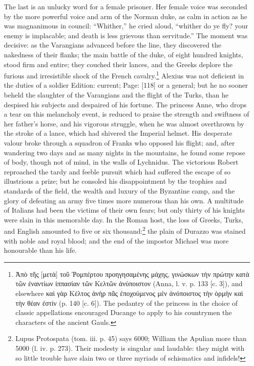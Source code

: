 {The last is an unlucky word for a female prisoner.} Her female voice was seconded by the more powerful voice and arm of the Norman duke, as calm in action as he was magnanimous in council: \texthebrew{“}Whither,\texthebrew{}” he cried aloud, \texthebrew{“}whither do ye fly? your enemy is implacable; and death is less grievous than servitude.\texthebrew{}” The moment was decisive: as the Varangians advanced before the line, they discovered the nakedness of their flanks; the main battle of the duke, of eight hundred knights, stood firm and entire; they couched their lances, and the Greeks deplore the furious and irresistible shock of the French cavalry.\footnote{\textgreek{\texthebrew{Ἀ}π\texthebrew{ὸ} τ\texthebrew{ῆ}ς} [\textgreek{μετ\texthebrew{ὰ}}] \textgreek{το\texthebrew{ῦ Ῥ}ομπέρτου προηγησαμένης μάχης, γινώσκων τ\texthebrew{ὴ}ν πρώτην κατ\texthebrew{ὰ} τ\texthebrew{ῶ}ν \texthebrew{ἐ}ναντίων \texthebrew{ἰ}ππασίαν τ\texthebrew{ῶ}ν Κελτ\texthebrew{ῶ}ν \texthebrew{ἀ}νύποιστον} (Anna, l. v. p. 133 [c. 3]), and elsewhere \textgreek{κα\texthebrew{ὶ} γ\texthebrew{ὰ}ρ Κέλτος \texthebrew{ἁ}ν\texthebrew{ὴ}ρ π\texthebrew{ᾶ}ς \texthebrew{ἐ}ποχούμενος μ\texthebrew{ὲ}ν \texthebrew{ἀ}νόποιστος τ\texthebrew{ὴ}ν \texthebrew{ὸ}ρμ\texthebrew{ὴ}ν κα\texthebrew{ὶ} τ\texthebrew{ὴ}ν θέαν \texthebrew{ἐ}στίν} (p. 140 [c. 6]). The pedantry of the princess in the choice of classic appellations encouraged Ducange to apply to his countrymen the characters of the ancient Gauls.} Alexius was not deficient in the duties of a soldier Edition: current; Page: [118] or a general; but he no sooner beheld the slaughter of the Varangians and the flight of the Turks, than he despised his subjects and despaired of his fortune. The princess Anne, who drops a tear on this melancholy event, is reduced to praise the strength and swiftness of her father\texthebrew{}’s horse, and his vigorous struggle, when he was almost overthrown by the stroke of a lance, which had shivered the Imperial helmet. His desperate valour broke through a squadron of Franks who opposed his flight; and, after wandering two days and as many nights in the mountains, he found some repose of body, though not of mind, in the walls of Lychnidus. The victorious Robert reproached the tardy and feeble pursuit which had suffered the escape of so illustrious a prize; but he consoled his disappointment by the trophies and standards of the field, the wealth and luxury of the Byzantine camp, and the glory of defeating an army five times more numerous than his own. A multitude of Italians had been the victims of their own fears; but only thirty of his knights were slain in this memorable day. In the Roman host, the loss of Greeks, Turks, and English amounted to five or six thousand:\footnote{Lupus Protospata (tom. iii. p. 45) says 6000; William the Apulian more than 5000 (l. iv. p. 273). Their modesty is singular and laudable: they might with so little trouble have slain two or three myriads of schismatics and infidels!} the plain of Durazzo was stained with noble and royal blood; and the end of the impostor Michael was more honourable than his life.

